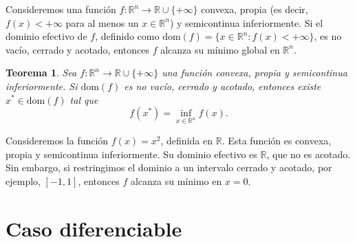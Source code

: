 \documentclass[12pt]{book}
\newtheorem{theorem}{Teorema}
\theoremstyle{definition}
\theoremstyle{plain}
\theoremstyle{remark}
\begin{document}

Consideremos una función $f: \mathbb{R}^n \to \mathbb{R} \cup \{+\infty\}$ convexa, propia (es decir, $f(x) < +\infty$ para al menos un $x \in \mathbb{R}^n$) y semicontinua inferiormente. Si el dominio efectivo de $f$, definido como $\text{dom}(f) = \{x \in \mathbb{R}^n : f(x) < +\infty\}$, es no vacío, cerrado y acotado, entonces $f$ alcanza su mínimo global en $\mathbb{R}^n$.

\begin{theorem}
    Sea $f: \mathbb{R}^n \to \mathbb{R} \cup \{+\infty\}$ una función convexa, propia y semicontinua inferiormente. Si $\text{dom}(f)$ es no vacío, cerrado y acotado, entonces existe $x^* \in \text{dom}(f)$ tal que
    \begin{equation*}
        f(x^*) = \inf_{x \in \mathbb{R}^n} f(x).
    \end{equation*}
\end{theorem}




Consideremos la función $f(x) = x^2$, definida en $\mathbb{R}$. Esta función es convexa, propia y semicontinua inferiormente. Su dominio efectivo es $\mathbb{R}$, que no es acotado. Sin embargo, si restringimos el dominio a un intervalo cerrado y acotado, por ejemplo, $[-1, 1]$, entonces $f$ alcanza su mínimo en $x = 0$.

\section{Caso diferenciable}
\end{document}
